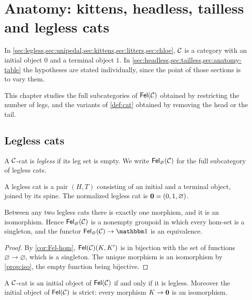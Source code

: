 \chapter{Anatomy: kittens, headless, tailless and legless cats}\label{ch:anatomy}

\begin{assumption}\label{ass:ch4}
In \cref{sec:legless,sec:unipedal,sec:kittens,sec:litters,sec:chloe}, $\mathcal{C}$ is a
category with an initial object $0$ and a terminal object $1$. In
\cref{sec:headless,sec:tailless,sec:anatomy-table} the hypotheses are stated
individually, since the point of those sections is to vary them.
\end{assumption}

This chapter studies the full subcategories of $\mathsf{Fel}(\mathcal{C})$ obtained by
restricting the number of legs, and the variants of \cref{def:cat} obtained by
removing the head or the tail.

\section{Legless cats}\label{sec:legless}

\begin{definition}\label{def:legless}
A $\mathcal{C}$-cat is \emph{legless} if its leg set is empty. We write
$\mathsf{Fel}_{\varnothing}(\mathcal{C})$ for the full subcategory of legless cats.
\end{definition}

A legless cat is a pair $(H,T)$ consisting of an initial and a terminal
object, joined by its spine. The normalized legless cat is $\mathbf{0}=(0,1,\varnothing)$.

\begin{proposition}\label{prop:legless-contractible}
Between any two legless cats there is exactly one morphism, and it is an
isomorphism. Hence $\mathsf{Fel}_\varnothing(\mathcal{C})$ is a nonempty groupoid in which
every hom-set is a singleton, and the functor $\Fel_\varnothing(\cC)\to\one$
is an equivalence.
\end{proposition}

\begin{proof}
By \cref{cor:Fel-hom}, $\mathsf{Fel}(\mathcal{C})(K,K')$ is in bijection with the set of
functions $\varnothing\to\varnothing$, which is a singleton. The unique
morphism is an isomorphism by \cref{prop:iso}, the empty function being
bijective.
\end{proof}

\begin{proposition}\label{prop:legless-initial}
A $\mathcal{C}$-cat is an initial object of $\mathsf{Fel}(\mathcal{C})$ if and only if it is legless.
Moreover the initial object of $\mathsf{Fel}(\mathcal{C})$ is strict: every morphism $K\to\mathbf{0}$
is an isomorphism.
\end{proposition}

